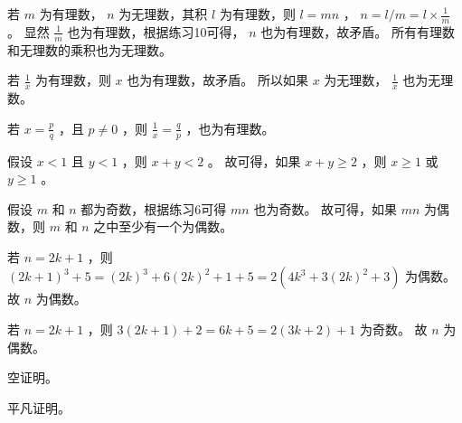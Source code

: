 {{        %
        \begin{practices}
            若 $m$ 为有理数， $n$ 为无理数，其积 $l$ 为有理数，则 $l = mn$ ， $n = l / m = l \times \frac{1}{m}$ 。
            显然 $\frac{1}{m}$ 也为有理数，根据练习10可得， $n$ 也为有理数，故矛盾。
            所有有理数和无理数的乘积也为无理数。
        \end{practices}

        \begin{practices}
            若 $\frac{1}{x}$ 为有理数，则 $x$ 也为有理数，故矛盾。
            所以如果 $x$ 为无理数， $\frac{1}{x}$ 也为无理数。
        \end{practices}

        \begin{practices}
            若 $x = \frac{p}{q}$ ，且 $p \neq 0$ ，则 $\frac{1}{x} = \frac{q}{p}$ ，也为有理数。
        \end{practices}

        \begin{practices}
            假设 $x < 1$ 且 $y < 1$ ，则 $x + y < 2$ 。
            故可得，如果 $x + y \geq 2$ ，则 $x \geq 1$ 或 $y \geq 1$ 。
        \end{practices}

        \begin{practices}
            假设 $m$ 和 $n$ 都为奇数，根据练习6可得 $mn$ 也为奇数。
            故可得，如果 $mn$ 为偶数，则 $m$ 和 $n$ 之中至少有一个为偶数。
        \end{practices}

        \begin{practices}
            若 $n = 2k + 1$ ，则 $(2k + 1)^3 + 5 = (2k)^3 + 6(2k)^2 + 1 + 5 = 2(4k^3 + 3(2k)^2 + 3)$ 为偶数。
            故 $n$ 为偶数。
        \end{practices}

        \begin{practices}
            若 $n = 2k + 1$ ，则 $3(2k + 1) +2 = 6k + 5 = 2(3k + 2) + 1$ 为奇数。
            故 $n$ 为偶数。
        \end{practices}

        \begin{practices}
            空证明。
        \end{practices}

        \begin{practices}
            平凡证明。
        \end{practices}

}}
